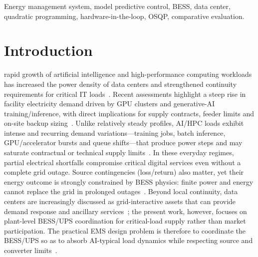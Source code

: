 \documentclass{ieeeaccess}
\begin{document}
\begin{keywords}
Energy management system, model predictive control, BESS, data center, quadratic programming, hardware-in-the-loop, OSQP, comparative evaluation.
\end{keywords}

\titlepgskip=-15pt
\maketitle

\section{Introduction}
 rapid growth of artificial intelligence and high-performance computing workloads has increased the power density of data centers and strengthened continuity requirements for critical IT loads~\cite{noland2024ai,iea2025electricity,zhang2024reliability,iqbal2026reliability}. Recent assessments highlight a steep rise in facility electricity demand driven by GPU clusters and generative-AI training/inference, with direct implications for supply contracts, feeder limits and on-site backup sizing~\cite{noland2024ai,iea2025electricity,ieee2025gridready,li2025aiload}. Unlike relatively steady profiles, AI/HPC loads exhibit intense and recurring demand variations---training jobs, batch inference, GPU/accelerator bursts and queue shifts---that produce power steps and may saturate contractual or technical supply limits~\cite{li2025aiload,mughees2025forecast,vercellino2026measurement}. In these everyday regimes, partial electrical shortfalls compromise critical digital services even without a complete grid outage. Source contingencies (loss/return) also matter, yet their energy outcome is strongly constrained by BESS physics: finite power and energy cannot replace the grid in prolonged outages~\cite{iqbal2026reliability,mou2026stochastic,zhao2023bess,zhang2024reliability}. Beyond local continuity, data centers are increasingly discussed as grid-interactive assets that can provide demand response and ancillary services~\cite{paananen2023grid,alapera2018flexibility,zhang2025flex,cioara2016dr,kez2021ffr}; the present work, however, focuses on plant-level BESS/UPS coordination for critical-load supply rather than market participation. The practical EMS design problem is therefore to coordinate the BESS/UPS so as to absorb AI-typical load dynamics while respecting source and converter limits~\cite{teague2025ups,azizi2026gf}.
\end{document}
